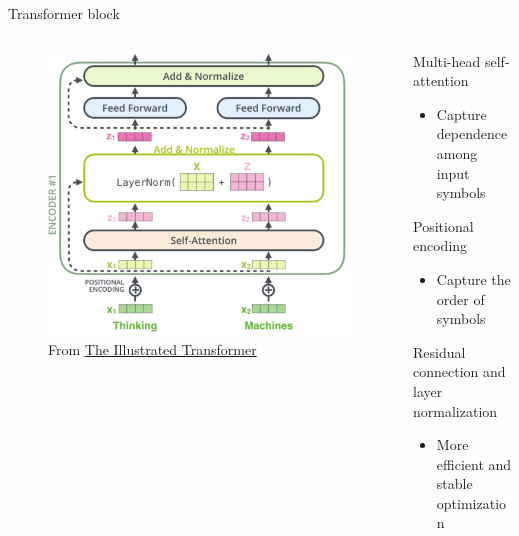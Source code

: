 \documentclass[usenames,dvipsnames,notes,11pt,aspectratio=169,hyperref={colorlinks=true, linkcolor=blue}]{beamer}
\begin{document}
\begin{frame}
    {Transformer block}
    \begin{columns}
        \begin{column}{0.4\textwidth}
            \begin{figure}
                \includegraphics[width=\columnwidth]{figures/transformer-block}
                \caption{From \href{https://jalammar.github.io/illustrated-transformer}{The Illustrated Transformer}}
            \end{figure}
        \end{column}
        \begin{column}{0.6\textwidth}
            \begin{wideitemize}[<+->]
                \item Multi-head self-attention
                    \begin{itemize}
                        \item Capture dependence among input symbols
                    \end{itemize}
                \item Positional encoding 
                    \begin{itemize}
                        \item Capture the order of symbols 
                    \end{itemize}
                \item Residual connection and layer normalization 
                    \begin{itemize}
                        \item More efficient and stable optimization
                    \end{itemize}
            \end{wideitemize}
        \end{column}
    \end{columns}
\end{frame}
\end{document}
